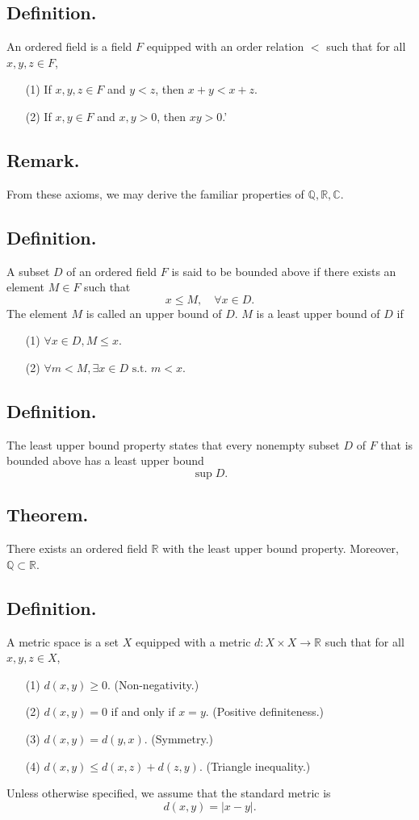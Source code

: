 \documentclass[titlepage]{article}
\begin{document}
\subsection{Definition.} An ordered field is a field $F$ equipped with an order relation $<$ such that for all $x,y,z \in F$, 
\begin{enumerate}
\item[(1)] If $x,y,z \in F$ and $y < z$, then $x + y < x + z$.
\item[(2)] If $x,y \in F$ and $x,y > 0$, then $xy > 0$.'
\end{enumerate}

\subsection{Remark.} From these axioms, we may derive the familiar properties of $\mathbb{Q}, \mathbb{R}, \mathbb{C}$.

\subsection{Definition.} A subset $D$ of an ordered field $F$ is said to be bounded above if there exists an element $M \in F$ such that 
$$x \leq M, \quad \forall x \in D.$$
The element $M$ is called an upper bound of $D$. $M$ is a least upper bound of $D$ if
\begin{enumerate}
\item[(1)] $\forall x \in D, M \leq x$.
\item[(2)] $\forall m < M, \exists x \in D \text{ s.t. } m < x$.
\end{enumerate}

\subsection{Definition.} The least upper bound property states that every nonempty subset $D$ of $F$ that is bounded above has a least upper bound
$$\sup D.$$

\subsection{Theorem.} There exists an ordered field $\mathbb{R}$ with the least upper bound property. Moreover, $\mathbb{Q} \subset \mathbb{R}$.

\subsection{Definition.} A metric space is a set $X$ equipped with a metric $d: X \times X \to \mathbb{R}$ such that for all $x,y,z \in X$,
\begin{enumerate}
\item[(1)] $d(x,y) \geq 0$. (Non-negativity.)
\item[(2)] $d(x,y) = 0$ if and only if $x = y$. (Positive definiteness.)
\item[(3)] $d(x,y) = d(y,x)$. (Symmetry.)
\item[(4)] $d(x,y) \leq d(x,z) + d(z,y)$. (Triangle inequality.)
\end{enumerate}
Unless otherwise specified, we assume that the standard metric is 
$$d(x,y) = |x-y|.$$
\end{document}
